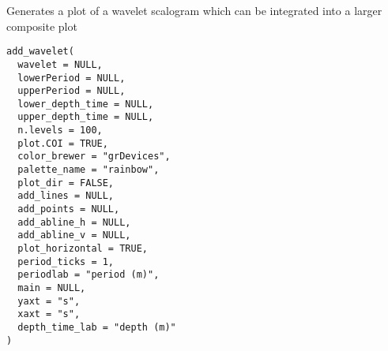 \documentclass[a4paper]{book}
\begin{document}
%
\begin{Description}
Generates a plot of a wavelet scalogram which can be integrated into
a larger composite plot
\end{Description}
%
\begin{Usage}
\begin{verbatim}
add_wavelet(
  wavelet = NULL,
  lowerPeriod = NULL,
  upperPeriod = NULL,
  lower_depth_time = NULL,
  upper_depth_time = NULL,
  n.levels = 100,
  plot.COI = TRUE,
  color_brewer = "grDevices",
  palette_name = "rainbow",
  plot_dir = FALSE,
  add_lines = NULL,
  add_points = NULL,
  add_abline_h = NULL,
  add_abline_v = NULL,
  plot_horizontal = TRUE,
  period_ticks = 1,
  periodlab = "period (m)",
  main = NULL,
  yaxt = "s",
  xaxt = "s",
  depth_time_lab = "depth (m)"
)
\end{verbatim}
\end{Usage}
%
\end{document}
